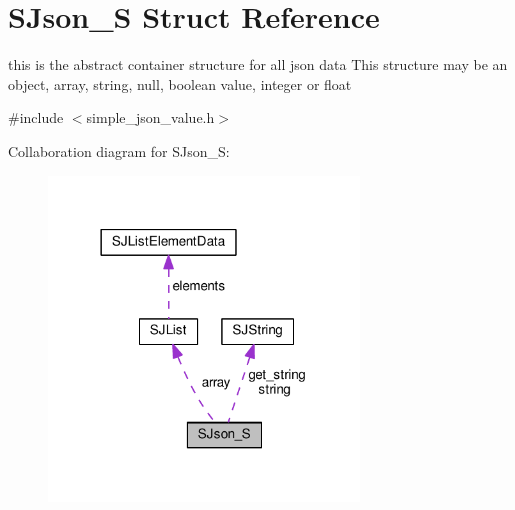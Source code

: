 \hypertarget{structSJson__S}{}\section{S\+Json\+\_\+S Struct Reference}
\label{structSJson__S}


this is the abstract container structure for all json data This structure may be an object, array, string, null, boolean value, integer or float  




{\ttfamily \#include $<$simple\+\_\+json\+\_\+value.\+h$>$}



Collaboration diagram for S\+Json\+\_\+S\+:
\nopagebreak
\begin{figure}[H]
\begin{center}
\leavevmode
\includegraphics[width=234pt]{d2/d22/structSJson__S__coll__graph}
\end{center}
\end{figure}
